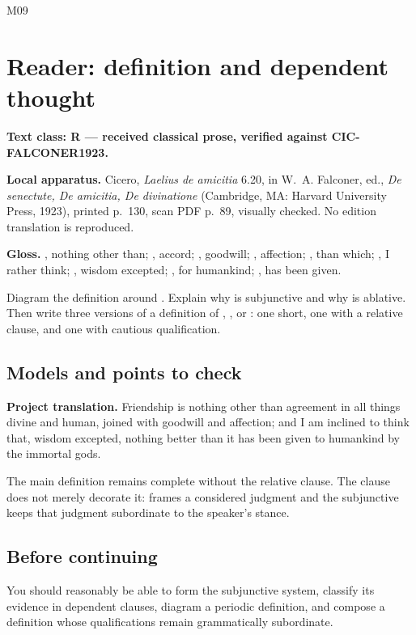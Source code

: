 \begin{courseunit}{M09}
\chapter{Reader: definition and dependent thought}

\textbf{Text class: R --- received classical prose, verified against
CIC-FALCONER1923.}

\ReaderCiceroFriendship

\textbf{Local apparatus.} Cicero, \textit{Laelius de amicitia} 6.20, in
W.~A. Falconer, ed., \textit{De senectute, De amicitia, De divinatione}
(Cambridge, MA: Harvard University Press, 1923), printed p.~130, scan PDF
p.~89, visually checked.  No edition translation is reproduced.

\textbf{Gloss.} , nothing other than;
, accord; , goodwill;
, affection; , than which;
, I rather think; , wisdom
excepted; , for humankind; , has been given.

Diagram the definition around .  Explain why
 is subjunctive and why  is ablative.  Then write three
versions of a definition of , , or :
one short, one with a relative clause, and one with cautious qualification.

\ifsolutions
\section{Models and points to check}
\textbf{Project translation.} Friendship is nothing other than agreement in
all things divine and human, joined with goodwill and affection; and I am
inclined to think that, wisdom excepted, nothing better than it has been given
to humankind by the immortal gods.

The main definition remains complete without the relative clause.  The clause
does not merely decorate it:  frames a considered judgment
and the subjunctive keeps that judgment subordinate to the speaker's stance.
\else
\section{Before continuing}
You should reasonably be able to form the subjunctive system, classify its
evidence in dependent clauses, diagram a periodic definition, and compose a
definition whose qualifications remain grammatically subordinate.
\fi
\end{courseunit}

